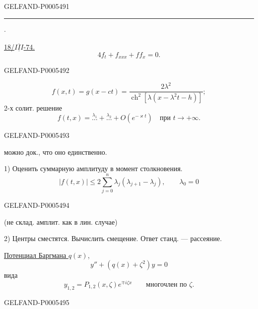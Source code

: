 \begin{GelfandAdjacentEvidence}{GELFAND-P000549}{1}
\hfill\rule{1.5cm}{.35pt}\enspace\(\cdot\)\par
\uline{18/\mbox{$\overline{\underline{III}}$}-74.}\qquad
{}\qquad{}
\[
4f_t+f_{xxx}+ff_x=0.
\]
\end{GelfandAdjacentEvidence}
\begin{GelfandAdjacentEvidence}{GELFAND-P000549}{2}

\[
f(x,t)=g(x-ct)=
\frac{2\lambda^2}{\operatorname{ch}^2[\lambda(x-\lambda^2t-h)]};
\]
2-х солит. решение
\[
f(t,x)=\overset{\lambda_1}{\ldots}+\overset{\lambda_2}{\ldots}
+O(e^{-\varkappa t})\quad\text{при }t\to+\infty.
\]
\end{GelfandAdjacentEvidence}
\begin{GelfandAdjacentEvidence}{GELFAND-P000549}{3}

можно док., что оно единственно.

1) Оценить суммарную амплитуду в момент столкновения.
\[
|f(t,x)|\le2\sum_{j=0}^{n}\lambda_j(\lambda_{j+1}-\lambda_j),
\qquad\lambda_0=0
\]
\end{GelfandAdjacentEvidence}
\begin{GelfandAdjacentEvidence}{GELFAND-P000549}{4}

(не склад. амплит. как в лин. случае)

2) Центры сместятся. Вычислить смещение. Ответ станд. — рассеяние.

\uline{Потенциал Баргмана \mbox{$q(x)$}}, 
\[
y''+(q(x)+\zeta^2)y=0
\]
вида
\[
y_{1,2}=P_{1,2}(x,\zeta)e^{\mp i\zeta x}
\qquad\text{многочлен по }\zeta.
\]
\end{GelfandAdjacentEvidence}
\begin{GelfandAdjacentEvidence}{GELFAND-P000549}{5}

\end{GelfandAdjacentEvidence}



